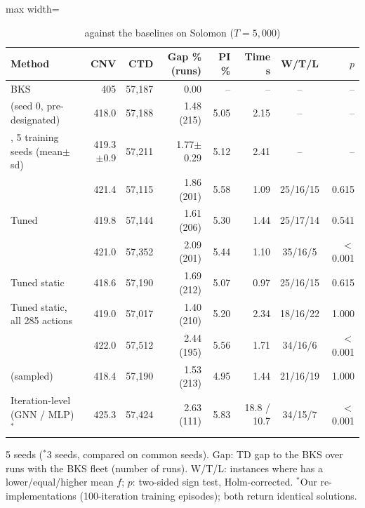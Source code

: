 \begin{table}[t]
\centering
\caption{\sgalns{} against the baselines on Solomon ($T=5{,}000$)}\label{tab:compare}
\setlength{\tabcolsep}{3pt}
\begin{adjustbox}{max width=\linewidth}
\begin{tabular}{lrrrrrcr}
\toprule
Method & CNV & CTD & Gap \% (runs) & PI \% & Time s & W/T/L & $p$\\ \midrule
BKS & 405 & 57,187 & 0.00 & -- & -- & -- & -- \\ \midrule
\sgalns{} (seed 0, pre-designated) & 418.0 & 57,188 & 1.48 (215) & 5.05 & 2.15 & -- & -- \\
\sgalns{}, 5 training seeds (mean$\pm$sd) & 419.3$\pm$0.9 & 57,211 & 1.77$\pm$0.29 & 5.12 & 2.41 & -- & -- \\ \midrule
\Rw{} & 421.4 & 57,115 & 1.86 (201) & 5.58 & 1.09 & 25/16/15 & 0.615\\
Tuned \Rw{} & 419.8 & 57,144 & 1.61 (206) & 5.30 & 1.44 & 25/17/14 & 0.541\\
\Uni{} & 421.0 & 57,352 & 2.09 (201) & 5.44 & 1.10 & 35/16/5 & $<$0.001\\
Tuned static & 418.6 & 57,190 & 1.69 (212) & 5.07 & 0.97 & 25/16/15 & 0.615\\
Tuned static, all 285 actions & 419.0 & 57,017 & 1.40 (210) & 5.20 & 2.34 & 18/16/22 & 1.000\\
\sgc{} & 422.0 & 57,512 & 2.44 (195) & 5.56 & 1.71 & 34/16/6 & $<$0.001\\
\sgalns{} (sampled) & 418.4 & 57,190 & 1.53 (213) & 4.95 & 1.44 & 21/16/19 & 1.000\\
Iteration-level (GNN / MLP)$^{*}$ & 425.3 & 57,424 & 2.63 (111) & 5.83 & 18.8 / 10.7 & 34/15/7 & $<$0.001\\
\bottomrule
\end{tabular}
\end{adjustbox}
\par\vspace{2pt}\parbox{\linewidth}{\footnotesize 5 seeds ($^{*}$3 seeds, compared on common seeds). Gap: TD gap to the BKS over runs with the BKS fleet (number of runs). W/T/L: instances where \sgalns{} has a lower/equal/higher mean $f$; $p$: two-sided sign test, Holm-corrected. $^{*}$Our re-implementations (100-iteration training episodes); both return identical solutions.}
\end{table}
